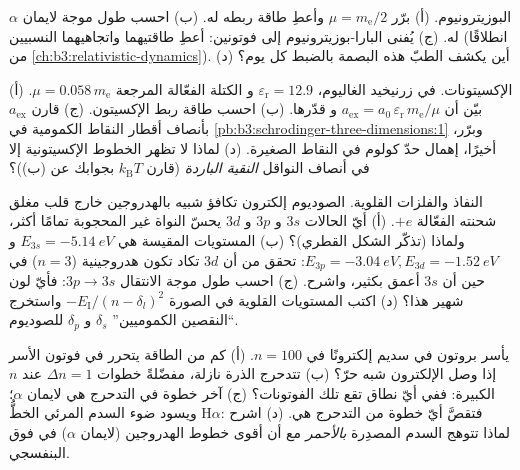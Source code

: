\begin{exercise}[$\star\star$]\label{exo:b3:hydrogen-atom:6}
البوزيترونيوم. (أ) برّر $\mu = m_{\text{e}}/2$ وأعطِ
طاقة ربطه  له. (ب) احسب طول موجة لايمان $\alpha$ له.
(ج) يُفنى البارا-بوزيترونيوم إلى فوتونين: أعطِ طاقتيهما
واتجاهيهما النسبيين (انطلاقًا من \cref{ch:b3:relativistic-dynamics}).
(د) أين يكشف الطبّ هذه البصمة بالضبط كل يوم؟
\end{exercise}

\begin{exercise}[$\star\star$]\label{exo:b3:hydrogen-atom:7}
الإكسيتونات. في زرنيخيد الغاليوم، $\varepsilon_{\text{r}} = 12.9$ و
الكتلة الفعّالة المرجعة $\mu = 0.058\,m_{\text{e}}$. (أ) بيّن أن
$a_{\text{ex}} = a_0\,\varepsilon_{\text{r}}\,m_{\text{e}}/\mu$ و
قدّرها. (ب) احسب طاقة ربط الإكسيتون. (ج) قارن
$a_{\text{ex}}$ بأنصاف أقطار النقاط الكمومية في
\cref{pb:b3:schrodinger-three-dimensions:1} وبرّر، أخيرًا،
إهمال حدّ كولوم في النقاط الصغيرة. (د) لماذا لا تظهر الخطوط
الإكسيتونية إلا في أنصاف النواقل \emph{النقية الباردة}
(قارن $k_{\text{B}}T$ بجوابك عن (ب))؟
\end{exercise}

\begin{exercise}[$\star\star$]\label{exo:b3:hydrogen-atom:8}
النفاذ والفلزات القلوية. الصوديوم إلكترون تكافؤ شبيه
بالهدروجين خارج قلب مغلق شحنته الفعّالة $+e$.
(أ) أيّ الحالات $3s$ و $3p$ و $3d$ يحسّ النواة غير المحجوبة
تمامًا أكثر، ولماذا (تذكّر الشكل القطري)؟ (ب) المستويات
المقيسة هي $E_{3s} = \qty{-5.14}{eV}$ و $E_{3p} = \qty{-3.04}{eV},
E_{3d} = \qty{-1.52}{eV}$: تحقق من أن $3d$ تكاد تكون هدروجينية
($n = 3$) في حين أن $3s$ أعمق بكثير، واشرح. (ج) احسب
طول موجة الانتقال $3p \to 3s$: فأيّ لون شهير هذا؟ (د) اكتب
المستويات القلوية في الصورة $-E_{\text{I}}/(n - \delta_l)^2$ واستخرج
``النقصين الكموميين'' $\delta_s$ و $\delta_p$ للصوديوم.
\end{exercise}

\begin{exercise}[$\star\star$]\label{exo:b3:hydrogen-atom:9}
يأسر بروتون في سديم إلكترونًا في $n = 100$. (أ) كم من
الطاقة يتحرر في فوتون الأسر إذا وصل الإلكترون شبه
حرّ؟ (ب) تتدحرج الذرة نازلة، مفضّلةً خطوات
$\Delta n = 1$ عند $n$ الكبيرة: ففي أيّ نطاق تقع تلك الفوتونات؟
(ج) آخر خطوة في التدحرج هي لايمان $\alpha$؛ ويسود ضوء السدم
المرئي الخطُّ H$\alpha$: فتقصَّ أيّ خطوة من التدحرج هي. (د)
اشرح لماذا تتوهج السدم المصدِرة \emph{بالأحمر} مع أن أقوى
خطوط الهدروجين (لايمان $\alpha$) في فوق
البنفسجي.
\end{exercise}

